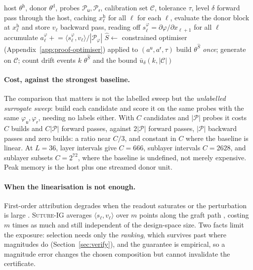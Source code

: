 \documentclass[10pt]{article}
\theoremstyle{plain}
\theoremstyle{definition}
\theoremstyle{remark}
\newcommand{\host}{\mathrm{h}}
\newcommand{\donor}{\mathrm{d}}
\newcommand{\util}{\mathsf{u}}
\newcommand{\risk}{\mathsf{r}}
\begin{document}
\begin{algorithm}[t]
\caption{\textsc{Suture}: one-pass graft selection with a certificate}
\label{alg:suture}
\begin{algorithmic}[1]
 host $\theta^{\host}$, donor $\theta^{\donor}$, probes
$\mathcal{P}_\util,\mathcal{P}_\risk$, calibration set $\mathcal{C}$, tolerance
$\tau$, level $\delta$
\FOR{$\varphi \in \{\varphi_\util, \varphi_\risk\}$ and each probe example $p$}
  \STATE forward pass through the host, caching $x^{\host}_\ell$ for all $\ell$
  \STATE for each $\ell$, evaluate the donor block at $x^{\host}_\ell$ and store
         $v_\ell$ \hfill{}
  \STATE backward pass, reading off $s^{\varphi}_\ell = \partial\varphi/\partial x_{\ell+1}$ for all $\ell$
  \STATE accumulate $a^{\varphi}_\ell \mathrel{+}= \langle s^{\varphi}_\ell, v_\ell\rangle / |\mathcal{P}_\varphi|$
\ENDFOR
\STATE $\widehat{S} \leftarrow$ constrained optimiser (Appendix~\ref{app:proof-optimiser}) applied to $(a^{\util}, a^{\risk}, \tau)$
\STATE build $\theta^{\widehat{S}}$ \emph{once}; generate on $\mathcal{C}$; count drift events $k$
 $\theta^{\widehat{S}}$ and the bound $\bar{u}_\delta(k, |\mathcal{C}|)$
\end{algorithmic}
\end{algorithm}

\paragraph{Cost, against the strongest baseline.}
The comparison that matters is not the labelled sweep but the \emph{unlabelled
surrogate sweep}: build each candidate and score it on the same probes with the
same $\varphi_\util,\varphi_\risk$, needing no labels either. With $C$ candidates
and $|\mathcal{P}|$ probes it costs $C$ builds and $C|\mathcal{P}|$ forward
passes, against $2|\mathcal{P}|$ forward passes, $|\mathcal{P}|$ backward passes
and zero builds: a ratio near $C/3$, and constant in $C$ where the baseline is
linear. At $L=36$, layer intervals give $C=666$, sublayer intervals $C=2628$, and
sublayer subsets $C=2^{72}$, where the baseline is undefined, not merely
expensive. Peak memory is the host plus one streamed donor unit.

\paragraph{When the linearisation is not enough.}
First-order attribution degrades when the readout saturates or the perturbation
is large \citep{syed2024attribution, kramar2024atp}. \textsc{Suture}-IG averages
$\langle s_\ell, v_\ell\rangle$ over $m$ points along the graft path
\citep{hanna2024eapig}, costing $m$ times as much and still independent of the
design-space size. Two facts limit the exposure: selection needs only the
\emph{ranking}, which survives past where magnitudes do
(Section~\ref{sec:verify}), and the guarantee is empirical, so a magnitude error
changes the chosen composition but cannot invalidate the certificate.
\end{document}
